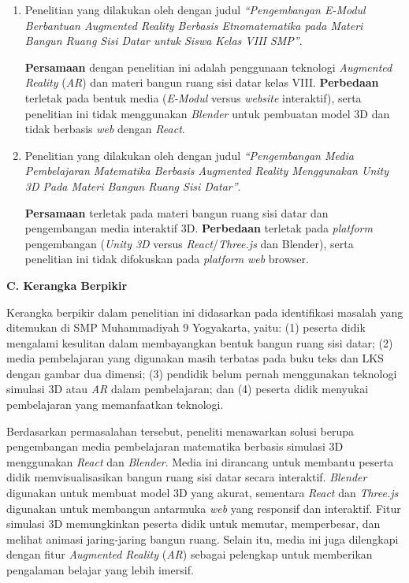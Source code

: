 \begin{enumerate}
    \item Penelitian yang dilakukan oleh \citet{nurdianah2025} dengan judul \textit{“Pengembangan E-Modul Berbantuan Augmented Reality Berbasis Etnomatematika pada Materi Bangun Ruang Sisi Datar untuk Siswa Kelas VIII SMP”}. 

    \textbf{Persamaan} dengan penelitian ini adalah penggunaan teknologi \textit{Augmented Reality} (\textit{AR}) dan materi bangun ruang sisi datar kelas VIII. \textbf{Perbedaan} terletak pada bentuk media (\textit{E-Modul} versus \textit{website} interaktif), serta penelitian ini tidak menggunakan \textit{Blender} untuk pembuatan model 3D dan tidak berbasis \textit{web} dengan \textit{React}.

    \item Penelitian yang dilakukan oleh \citet{rizwandyka2025} dengan judul \textit{“Pengembangan Media Pembelajaran Matematika Berbasis Augmented Reality Menggunakan Unity 3D Pada Materi Bangun Ruang Sisi Datar”}. 

    \textbf{Persamaan} terletak pada materi bangun ruang sisi datar dan pengembangan media interaktif 3D. \textbf{Perbedaan} terletak pada \textit{platform} pengembangan (\textit{Unity 3D} versus \textit{React}/\textit{Three.js} dan Blender), serta penelitian ini tidak difokuskan pada \textit{platform} \textit{web} browser.
\end{enumerate}

\textbf{C. Kerangka Berpikir}

\hspace*{1cm}Kerangka berpikir dalam penelitian ini didasarkan pada identifikasi masalah yang ditemukan di SMP Muhammadiyah 9 Yogyakarta, yaitu: (1) peserta didik mengalami kesulitan dalam membayangkan bentuk bangun ruang sisi datar; (2) media pembelajaran yang digunakan masih terbatas pada buku teks dan LKS dengan gambar dua dimensi; (3) pendidik belum pernah menggunakan teknologi simulasi 3D atau \textit{AR} dalam pembelajaran; dan (4) peserta didik menyukai pembelajaran yang memanfaatkan teknologi.

\hspace*{1cm}Berdasarkan permasalahan tersebut, peneliti menawarkan solusi berupa pengembangan media pembelajaran matematika berbasis simulasi 3D menggunakan \textit{React} dan \textit{Blender}. Media ini dirancang untuk membantu peserta didik memvisualisasikan bangun ruang sisi datar secara interaktif. \textit{Blender} digunakan untuk membuat model 3D yang akurat, sementara \textit{React} dan \textit{Three.js} digunakan untuk membangun antarmuka \textit{web} yang responsif dan interaktif. Fitur simulasi 3D memungkinkan peserta didik untuk memutar, memperbesar, dan melihat animasi jaring-jaring bangun ruang. Selain itu, media ini juga dilengkapi dengan fitur \textit{Augmented Reality} (\textit{AR}) sebagai pelengkap untuk memberikan pengalaman belajar yang lebih imersif.

